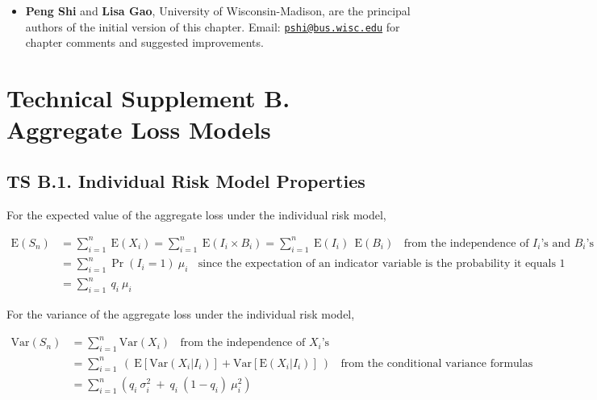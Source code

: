 \documentclass[]{book}
\providecommand{\tightlist}{%
  \setlength{\itemsep}{0pt}\setlength{\parskip}{0pt}}
\theoremstyle{definition}
\theoremstyle{definition}
\theoremstyle{definition}
\theoremstyle{remark}
\begin{document}
\begin{itemize}
\tightlist
\item
  \textbf{Peng Shi} and \textbf{Lisa Gao}, University of
  Wisconsin-Madison, are the principal authors of the initial version of
  this chapter. Email:
  \href{mailto:pshi@bus.wisc.edu}{\nolinkurl{pshi@bus.wisc.edu}} for
  chapter comments and suggested improvements.
\end{itemize}

\section*{Technical Supplement B. Aggregate Loss
Models}\label{technical-supplement-b.-aggregate-loss-models}

\subsection*{TS B.1. Individual Risk Model
Properties}\label{ts-b.1.-individual-risk-model-properties}

For the expected value of the aggregate loss under the individual risk
model,

\[\begin{aligned}
\mathrm{E}(S_n) &=\sum_{i=1}^n ~ \mathrm{E}(X_i) = \sum_{i=1}^n ~ \mathrm{E}(I_i \times B_i) = \sum_{i=1}^n ~ \mathrm{E}(I_i) ~~ \mathrm{E}(B_i) ~~~~ \text{from the independence of } I_i \text{'s and } B_i \text{'s} \\
&= \sum_{i=1}^n \Pr(I_i=1) ~ \mu_i ~~~~ \text{since the expectation of an indicator variable is the probability it equals } 1 \\
&= \sum_{i=1}^n ~ q_i ~ \mu_i
\end{aligned}\]

For the variance of the aggregate loss under the individual risk model,

\[\begin{aligned}
\mathrm{Var}(S_n) &= \sum_{i=1}^n \mathrm{Var}(X_i) ~~~~ \text{from the independence of } X_i \text{'s} \\
&= \sum_{i=1}^n ~ \left( ~ \mathrm{E}\left[ \mathrm{Var}(X_i | I_i) \right] + \mathrm{Var}\left[ \mathrm{E}(X_i|I_i) \right] ~ \right) ~~~~ \text{from the conditional variance formulas}  \\
&= \sum_{i=1}^n \left( q_i ~ \sigma_i^2 ~ + ~ q_i ~ (1-q_i) ~ \mu_i^2 \right)
\end{aligned}\]
\end{document}
